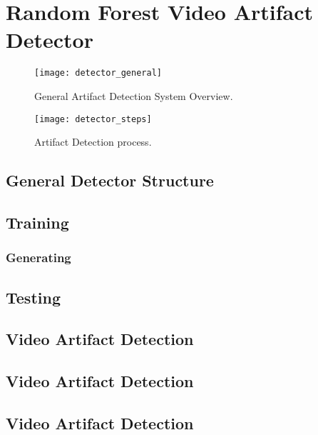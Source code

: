 \chapter{Random Forest Video Artifact Detector }
\label{ch:solucion}

\begin{figure} [!h]
  \centering
  
  \texttt{[image: detector\_general]}
  
  \caption{General Artifact Detection System Overview. }
  \label{fig:detector_overview}

\end{figure}

\begin{figure} [!h]
  \centering
  
  \texttt{[image: detector\_steps]}
  
  \caption{Artifact Detection process. }
  \label{fig:detector_steps}

\end{figure}

\section{General Detector Structure}
\label{sec:sol_struct}

\section{Training}
\label{sec:sol_}

\subsection{Generating }
\label{sec:intro_problem}

\section{Testing}
\label{sec:intro_problem}

\section{Video Artifact Detection}
\label{sec:intro_problem}

\section{Video Artifact Detection}
\label{sec:intro_problem}

\section{Video Artifact Detection}
\label{sec:intro_problem}
